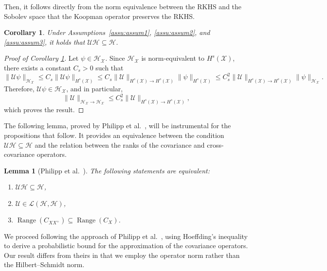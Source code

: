 \documentclass{article}
\newtheorem{lem}{Lemma}
\newtheorem{cor}{Corollary}
\renewcommand{\H}{\mathcal{H}}
\newcommand{\U}{\mathcal{U}}
\begin{document}
Then, it follows directly from the norm equivalence between the RKHS and the Sobolev space that the Koopman operator preserves the RKHS.

\begin{cor} \label{cor:koopman_preserve_rkhs}
Under Assumptions~\ref{assu:assum1}, \ref{assu:assum2}, and \ref{assu:assum3}, it holds that \( \U \H \subseteq \H \).
\end{cor}

\begin{proof}[Proof of Corollary \ref{cor:koopman_preserve_rkhs}]
Let \( \psi \in \mathcal{H}_\mathcal{X} \). Since \( \mathcal{H}_\mathcal{X} \) is norm-equivalent to \( H^s(\mathcal{X}) \), there exists a constant \( C_s > 0 \) such that
\[
\| \mathcal{U} \psi \|_{\mathcal{H}_\mathcal{X}} \leq C_s \| \mathcal{U} \psi \|_{H^s(\mathcal{X})} 
\leq C_s \| \mathcal{U} \|_{H^s(\mathcal{X}) \to H^s(\mathcal{X})} \| \psi \|_{H^s(\mathcal{X})}
\leq C_s^2 \| \mathcal{U} \|_{H^s(\mathcal{X}) \to H^s(\mathcal{X})} \| \psi \|_{\mathcal{H}_\mathcal{X}}.
\]
Therefore, \( \mathcal{U} \psi \in \mathcal{H}_\mathcal{X} \), and in particular,
\[
\| \mathcal{U} \|_{\mathcal{H}_\mathcal{X} \to \mathcal{H}_\mathcal{X}} \leq C_s^2 \| \mathcal{U} \|_{H^s(\mathcal{X}) \to H^s(\mathcal{X})},
\]
which proves the result.
\end{proof}

The following lemma, proved by Philipp et al.~\cite{Philipp2024ErrorOperator}, will be instrumental for the propositions that follow. It provides an equivalence between the condition \( \U \H \subseteq \H \) and the relation between the ranks of the covariance and cross-covariance operators.

\begin{lem}[Philipp et al.~\cite{Philipp2024ErrorOperator}] \label{lemma: rank_inclusion}
The following statements are equivalent:
\begin{enumerate}
    \item \( \U \H \subseteq \H \),
    \item \( \U \in \mathcal{L}(\H, \H) \),
    \item \( \operatorname{Range}(C_{XX^+}) \subseteq \operatorname{Range}(C_X) \).
\end{enumerate}
\end{lem}

We proceed following the approach of Philipp et al.~\cite{Philipp2024ErrorOperator}, using Hoeffding's inequality to derive a probabilistic bound for the approximation of the covariance operators. Our result differs from theirs in that we employ the operator norm rather than the Hilbert--Schmidt norm.
\end{document}
